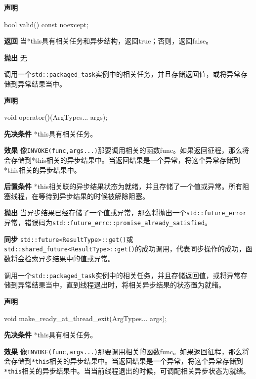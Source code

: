\textbf{声明}

\begin{cpp}
bool valid() const noexcept;
\end{cpp}

\textbf{返回}
当*this具有相关任务和异步结构，返回true；否则，返回false。

\textbf{抛出}
无


调用一个\texttt{std::packaged\_task}实例中的相关任务，并且存储返回值，或将异常存储到异常结果当中。

\textbf{声明}

\begin{cpp}
void operator()(ArgTypes... args);
\end{cpp}

\textbf{先决条件}
*this具有相关任务。

\textbf{效果}
像\texttt{INVOKE(func,args...)}那要调用相关的函数func。如果返回征程，那么将会存储到*this相关的异步结果中。当返回结果是一个异常，将这个异常存储到*this相关的异步结果中。

\textbf{后置条件}
*this相关联的异步结果状态为就绪，并且存储了一个值或异常。所有阻塞线程，在等待到异步结果的时候被解除阻塞。

\textbf{抛出}
当异步结果已经存储了一个值或异常，那么将抛出一个\texttt{std::future\_error}异常，错误码为\texttt{std::future\_errc::promise\_already\_satisfied}。

\textbf{同步}
\texttt{std::future<ResultType>::get()}或\texttt{std::shared\_future<ResultType>::get()}的成功调用，代表同步操作的成功，函数将会检索异步结果中的值或异常。


调用一个\texttt{std::packaged\_task}实例中的相关任务，并且存储返回值，或将异常存储到异常结果当中，直到线程退出时，将相关异步结果的状态置为就绪。

\textbf{声明}

\begin{cpp}
void make_ready_at_thread_exit(ArgTypes... args);
\end{cpp}

\textbf{先决条件}
*this具有相关任务。

\textbf{效果}
像\texttt{INVOKE(func,args...)}那要调用相关的函数func。如果返回征程，那么将会存储到\texttt{*this}相关的异步结果中。当返回结果是一个异常，将这个异常存储到\texttt{*this}相关的异步结果中。当当前线程退出的时候，可调配相关异步状态为就绪。

